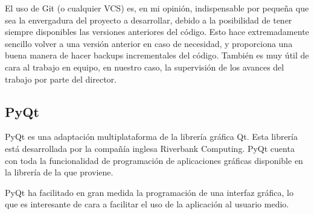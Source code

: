 El uso de Git (o cualquier VCS) es, en mi opinión, indispensable por pequeña que sea la envergadura del proyecto a desarrollar, debido a la posibilidad de tener siempre disponibles las versiones anteriores del código. Esto hace extremadamente sencillo volver a una versión anterior en caso de necesidad, y proporciona una buena manera de hacer backups incrementales del código. También es muy útil de cara al trabajo en equipo, en nuestro caso, la supervisión de los avances del trabajo por parte del director.

\subsection*{PyQt}
PyQt es una adaptación multiplataforma de la librería gráfica Qt. Esta librería está desarrollada por la compañía inglesa Riverbank Computing. PyQt cuenta con toda la funcionalidad de programación de aplicaciones gráficas disponible en la librería de la que proviene.

PyQt ha facilitado en gran medida la programación de una interfaz gráfica, lo que es interesante de cara a facilitar el uso de la aplicación al usuario medio.
\newpage